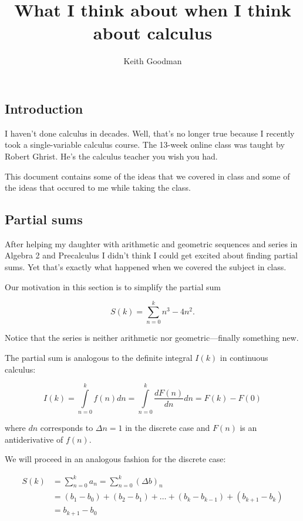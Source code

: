 \documentclass{article}
\begin{document}
\title{What I think about when I think about calculus}
\author{Keith Goodman}
\maketitle

\subsection*{Introduction}

I haven't done calculus in decades. Well, that's no longer true because I
recently took a single-variable calculus course. The 13-week online class was
taught by Robert Ghrist. He's the calculus teacher you wish you had.

This document contains some of the ideas that we covered in class and some of
the ideas that occured to me while taking the class.

\subsection*{Partial sums}

After helping my daughter with arithmetic and geometric sequences and series in
Algebra 2 and Precalculus I didn't think I could get excited about finding
partial sums. Yet that's exactly what happened when we covered the subject in
class.

Our motivation in this section is to simplify the partial sum

\[
    S(k)=\sum\limits_{n=0}^k n^3-4n^2.
\]

\noindent Notice that the series is neither arithmetic nor geometric---finally
something new.

The partial sum is analogous to the definite integral $I(k)$ in continuous
calculus:

\[
I(k)=\int\limits_{n=0}^k f(n)dn=\int\limits_{n=0}^k\frac{dF(n)}{dn}dn=F(k)-F(0)
\]

\noindent where $dn$ corresponds to $\Delta n=1$ in the discrete case and
$F(n)$ is an antiderivative of $f(n)$.

We will proceed in an analogous fashion for the discrete case:

\begin{align*}
    S(k) &= \sum\limits_{n=0}^k a_n = \sum\limits_{n=0}^k (\Delta b)_n \\
         &= (b_1 - b_0)+(b_2 - b_1)+ \ldots + (b_k - b_{k-1}) + (b_{k+1} - b_k) \\
         &= b_{k+1} - b_0
\end{align*}
\end{document}
